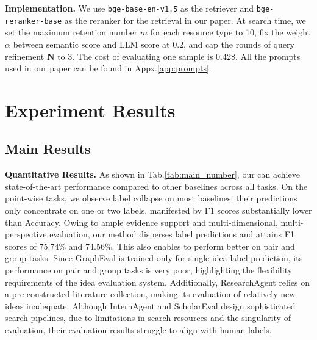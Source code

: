 \textbf{Implementation.}
We use \texttt{bge-base-en-v1.5} as the retriever and \texttt{bge-reranker-base} as the reranker \cite{bge} for the retrieval in our paper.
At search time, we set the maximum retention number $m$ for each resource type to 10, fix the weight $\alpha$ between semantic score and LLM score at 0.2, and cap the rounds of query refinement $\boldsymbol{N}$ to 3.
The cost of evaluating one sample is 0.42\$.
All the prompts used in our paper can be found in Appx.\ref{app:prompts}.

\section{Experiment Results}

\subsection{Main Results}
\textbf{Quantitative Results.}
As shown in Tab.\ref{tab:main_number}, our {\ours} can achieve state-of-the-art performance compared to other baselines across all tasks.
On the point-wise tasks, we observe label collapse on most baselines: their predictions only concentrate on one or two labels, manifested by F1 scores substantially lower than Accuracy.
Owing to ample evidence support and multi-dimensional, multi-perspective evaluation, our method disperses label predictions and attains F1 scores of 75.74\% and 74.56\%.
This also enables {\ours} to perform better on pair and group tasks.
Since GraphEval is trained only for single-idea label prediction, its performance on pair and group tasks is very poor, highlighting the flexibility requirements of the idea evaluation system.
Additionally, ResearchAgent relies on a pre-constructed literature collection, making its evaluation of relatively new ideas inadequate.
Although InternAgent and ScholarEval design sophisticated search pipelines, due to limitations in search resources and the singularity of evaluation, their evaluation results struggle to align with human labels.

